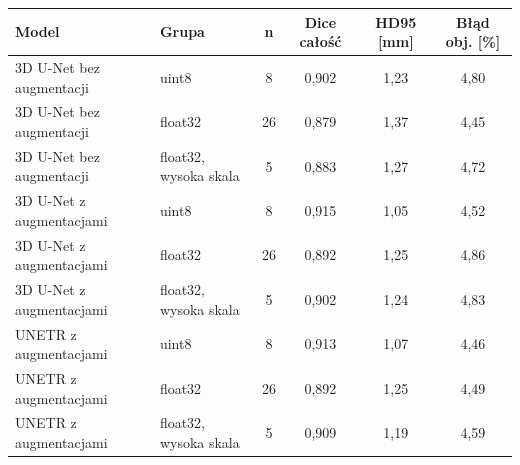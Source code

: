 \begin{tabular}{llcccc}
\hline
Model & Grupa & n & Dice całość & HD95 [mm] & Błąd obj. [\%] \\ \hline
3D U-Net bez augmentacji & uint8 & 8 & 0,902 & 1,23 & 4,80 \\
3D U-Net bez augmentacji & float32 & 26 & 0,879 & 1,37 & 4,45 \\
3D U-Net bez augmentacji & float32, wysoka skala & 5 & 0,883 & 1,27 & 4,72 \\
3D U-Net z augmentacjami & uint8 & 8 & 0,915 & 1,05 & 4,52 \\
3D U-Net z augmentacjami & float32 & 26 & 0,892 & 1,25 & 4,86 \\
3D U-Net z augmentacjami & float32, wysoka skala & 5 & 0,902 & 1,24 & 4,83 \\
UNETR z augmentacjami & uint8 & 8 & 0,913 & 1,07 & 4,46 \\
UNETR z augmentacjami & float32 & 26 & 0,892 & 1,25 & 4,49 \\
UNETR z augmentacjami & float32, wysoka skala & 5 & 0,909 & 1,19 & 4,59 \\
\hline
\end{tabular}